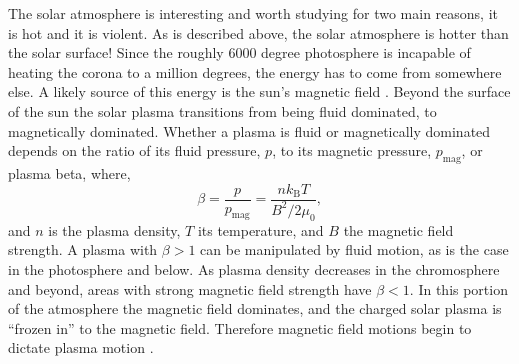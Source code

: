  
The solar atmosphere is interesting and worth studying for two main reasons, it is hot and it is violent.
As is described above, the solar atmosphere is hotter than the solar surface!
Since the roughly 6000 degree photosphere is incapable of heating the corona to a million degrees, the energy has to come from somewhere else.
A likely source of this energy is the sun's magnetic field \citep{Priest2014}.
Beyond the surface of the sun the solar plasma transitions from being fluid dominated, to magnetically dominated.
Whether a plasma is fluid or magnetically dominated depends on the ratio of its fluid pressure, $p$, to its magnetic pressure, $p_\text{mag}$, or plasma beta, where,
\begin{equation}
	\beta = \frac{p}{p_\text{mag}} = \frac{nk_\text{B}T}{B^2 / 2\mu_0},
\end{equation}
and $n$ is the plasma density, $T$ its temperature, and $B$ the magnetic field strength.
A plasma with $\beta>1$ can be manipulated by fluid motion, as is the case in the photosphere and below.
As plasma density decreases in the chromosphere and beyond, areas with strong magnetic field strength have $\beta<1$.  
In this portion of the atmosphere the magnetic field dominates, and the charged solar plasma is ``frozen in'' to the magnetic field.
Therefore magnetic field motions begin to dictate plasma motion \citep{Priest2014}.

